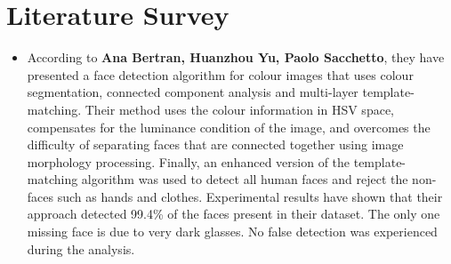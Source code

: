\section{Literature Survey}
\begin{itemize}

\item According to \textbf{Ana Bertran, Huanzhou Yu, Paolo Sacchetto}, they have presented a face detection algorithm for colour images that uses colour segmentation, connected component analysis and multi-layer template-matching. Their method uses the colour information in HSV space, compensates for the luminance condition of the image, and overcomes the difficulty of separating faces that are connected together using image morphology processing. Finally, an enhanced version of the template-matching algorithm was used to detect all human faces and reject the non-faces such as hands and clothes. Experimental results have shown that their approach detected 99.4\% of the faces present in their dataset. The only one missing face is due to very dark glasses. No false detection was experienced during the analysis.


\end{itemize}
